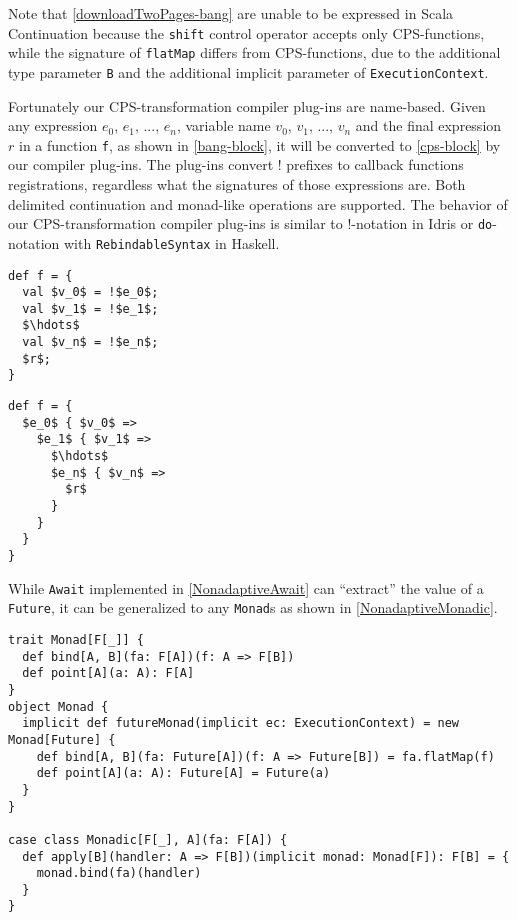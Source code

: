 Note that \cref{downloadTwoPages-bang} are unable to be expressed in Scala Continuation because the \lstinline{shift} control operator accepts only CPS-functions, while the signature of \lstinline{flatMap} differs from CPS-functions, due to the additional type parameter \lstinline{B} and the additional implicit parameter of \lstinline{ExecutionContext}.

Fortunately our CPS-transformation compiler plug-ins are name-based. Given any expression $e_0$, $e_1$, ..., $e_n$, variable name $v_0$, $v_1$, ..., $v_n$ and the final expression $r$ in a function \lstinline{f}, as shown in \cref{bang-block}, it will be converted to \cref{cps-block} by our compiler plug-ins. The plug-ins convert ! prefixes to callback functions registrations, regardless what the signatures of those expressions are. Both delimited continuation and monad-like operations are supported. The behavior of our CPS-transformation compiler plug-ins is similar to !-notation in Idris or \lstinline{do}-notation with \lstinline{RebindableSyntax} in Haskell.

\begin{lstlisting}[mathescape=true, caption={A function with !-notation}, label={bang-block}]
def f = {
  val $v_0$ = !$e_0$;
  val $v_1$ = !$e_1$;
  $\hdots$
  val $v_n$ = !$e_n$;
  $r$;
}
\end{lstlisting}

\begin{lstlisting}[mathescape=true,caption={The code converted from !-notation by our name-based CPS-transformation plug-ins}, label={cps-block}]
def f = {
  $e_0$ { $v_0$ =>
    $e_1$ { $v_1$ =>
      $\hdots$
      $e_n$ { $v_n$ =>
        $r$
      }
    }
  }
}
\end{lstlisting}

While \lstinline{Await} implemented in \cref{NonadaptiveAwait} can ``extract'' the value of a \lstinline{Future}, it can be generalized to any \lstinline{Monad}s as shown in \cref{NonadaptiveMonadic}.

\begin{lstlisting}[caption={Implementing \lstinline{Monadic} LDK as a forwarder to \lstinline{Monad}},label={NonadaptiveMonadic}]
trait Monad[F[_]] {
  def bind[A, B](fa: F[A])(f: A => F[B])
  def point[A](a: A): F[A]
}
object Monad {
  implicit def futureMonad(implicit ec: ExecutionContext) = new Monad[Future] {
    def bind[A, B](fa: Future[A])(f: A => Future[B]) = fa.flatMap(f)
    def point[A](a: A): Future[A] = Future(a)
  }
}

case class Monadic[F[_], A](fa: F[A]) {
  def apply[B](handler: A => F[B])(implicit monad: Monad[F]): F[B] = {
    monad.bind(fa)(handler)
  }
}
\end{lstlisting}

